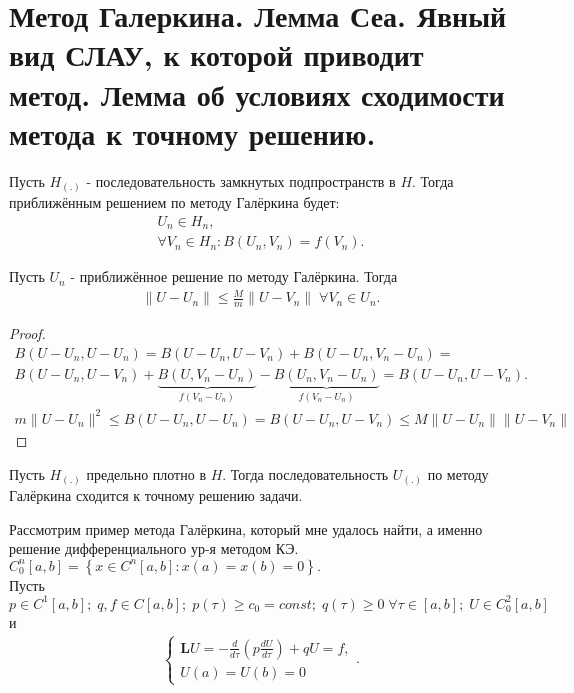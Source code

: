 \documentclass[__main__.tex]{subfiles}
\begin{document}
\section{Метод Галеркина. Лемма Сеа. Явный вид СЛАУ, к которой приводит метод. Лемма об условиях сходимости метода к точному решению.}

\begin{definition}
	Пусть $H_{(.)}$ - последовательность замкнутых подпространств в $H.$
	Тогда приближённым решением по методу Галёркина будет:
	\begin{gather*}
	U_n \in H_n,\\
	\forall V_n \in H_n: B(U_n,V_n)=f(V_n).
	\end{gather*}
\end{definition}

\begin{theorem}
	Пусть $U_n$ - приближённое решение по методу Галёркина. Тогда
	\begin{gather*}
	\parallel U-U_n\parallel\le\frac{M}{m}\parallel U-V_n\parallel\;\forall V_n\in U_n.
	\end{gather*}
\end{theorem}

\begin{proof}
\begin{gather*}
B(U-U_n ,U-U_n)=B(U-U_n ,U-V_n)+B(U-U_n ,V_n-U_n)=\\
B(U-U_n ,U-V_n)+\underbrace{B(U,V_n-U_n)}_{f(V_n-U_n)}-\underbrace{B(U_n,V_n-U_n)}_{f(V_n-U_n)}=
B(U-U_n,U-V_n).\\
m\parallel U-U_n\parallel^2\le B(U-U_n,U-U_n)=B(U-U_n,U-V_n)\le M\parallel U-U_n\parallel\parallel U-V_n\parallel
\end{gather*}
\end{proof}
	\begin{theorem}Пусть $H_{(.)}$ предельно плотно в $H$. Тогда последовательность $U_{(.)}$ по методу Галёркина сходится к точному решению задачи.
\end{theorem}
	Рассмотрим пример метода Галёркина, который мне удалось найти, а именно решение дифференциального ур-я методом КЭ.\\
	$C^n_0[a,b]=\left\{x\in C^n[a,b]: x(a)=x(b)=0\right\}.$\\
	Пусть $p\in C^1[a,b];\;q,f\in C[a,b];\;p(\tau)\ge c_0=const;\;q(\tau)\ge 0\;\forall\tau\in[a,b];\;U\in C^2_0[a,b]$ и
	\begin{gather*}
	\begin{cases}
	\mathbf{L}U=-\frac{d}{d\tau}\left(p\frac{dU}{d\tau}\right)+qU=f,\\
	U(a)=U(b)=0
	\end{cases}.
	\end{gather*}
	
\end{document}
